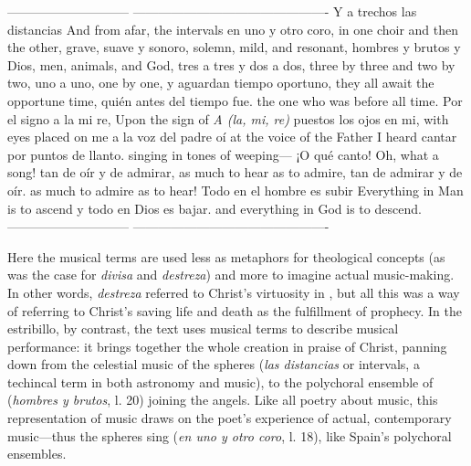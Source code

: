 -----------------------------   ----------------------------------------------
Y a trechos las distancias      And from afar, the intervals
en uno y otro coro,             in one choir and then the other,
grave, suave y sonoro,          solemn, mild, and resonant,
hombres y brutos y Dios,        men, animals, and God,
tres a tres y dos a dos,        three by three and two by two,
uno a uno,                      one by one,
y aguardan tiempo oportuno,     they all await the opportune time,
quién antes del tiempo fue.     the one who was before all time.
Por el signo a la mi re,        Upon the sign of \emph{A (la, mi, re)}
puestos los ojos en mi,         with eyes placed on me 
a la voz del padre oí           at the voice of the Father I heard
cantar por puntos de llanto.    singing in tones of weeping---
¡O qué canto!                   Oh, what a song!
tan de oír y de admirar,        as much to hear as to admire,
tan de admirar y de oír.        as much to admire as to hear!
Todo en el hombre es subir      Everything in Man is to ascend
y todo en Dios es bajar.        and everything in God is to descend.
-----------------------------   ----------------------------------------------

\noindent
Here the musical terms are used less as metaphors for theological concepts (as
was the case for \emph{divisa} and \emph{destreza}) and more to imagine actual
music-making.
In other words, \emph{destreza} referred to Christ's virtuosity in , but all this was a way of referring to Christ's saving life
and death as the fulfillment of prophecy.
In the estribillo, by contrast, the text uses musical terms to describe musical
performance: it brings together the whole creation in praise of Christ, panning
down from the celestial music of the spheres (\emph{las distancias} or intervals, a
techincal term in both astronomy and music), to the polychoral ensemble of
 (\emph{hombres y brutos}, l. 20) joining the angels.
Like all poetry about music, this representation of music draws on the poet's
experience of actual, contemporary music---thus the spheres sing  (\emph{en uno y otro coro}, l. 18), like Spain's polychoral
ensembles.

